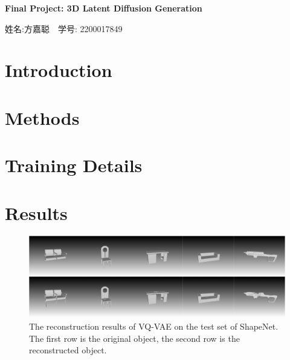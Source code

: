 \documentclass[11pt]{article}
\newcommand\1{\mathds{1}}
\begin{document}
\pagestyle{fancy}
\chead{}
\fancyfoot[R]{} 
\fancyfoot[C]{\thepage\ /\ \pageref{LastPage} \\ \textcolor{lightgray}{最后编译时间: \today}}


\begin{center}
    {\LARGE \bf Final Project: 3D Latent Diffusion Generation} 

    {\kaishu 姓名:方嘉聪\ \  学号: 2200017849}            %
\end{center}

\section{Introduction}



\section{Methods}

\section{Training Details}

\section{Results}

\begin{figure}[htbp]
    \centering
    \includegraphics[width=1.0\textwidth]{imgs/vqvae.pdf}
    \caption{The reconstruction results of VQ-VAE on the test set of ShapeNet. The first row is the original object, the second row is the reconstructed object.}
\end{figure}
\end{document}

